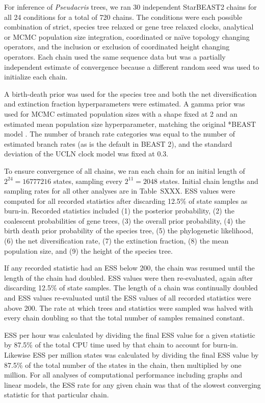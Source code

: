 \documentclass[nogrid]{MBE}%
\begin{document}
For inference of \textit{Pseudacris} trees, we ran 30 independent StarBEAST2
chains for all 24 conditions for a total of 720 chains. The conditions were
each possible combination of strict, species tree relaxed or gene tree relaxed
clocks, analytical or MCMC population size integration, coordinated or na\"ive
topology changing operators, and the inclusion or exclusion of coordinated
height changing operators. Each chain used the same sequence data but was a
partially independent estimate of convergence because a different random seed
was used to initialize each chain.

A birth-death prior was used for the species tree and both the net
diversification and extinction fraction hyperparameters were estimated. A
gamma prior was used for MCMC estimated population sizes with a shape fixed at
2 and an estimated mean population size hyperparameter, matching the original
*BEAST model \citep{Heled01032010}. The number of branch rate categories was
equal to the number of estimated branch rates (as is the default in BEAST 2),
and the standard deviation of the UCLN clock model was fixed at 0.3.

To ensure convergence of all chains, we ran each chain for an initial length
of $2^{24} = 16777216$ states, sampling every $2^{11} = 2048$ states. Initial
chain lengths and sampling rates for all other analyses are in Table~SXXX. ESS
values were computed for all recorded statistics after discarding 12.5\% of
state samples as burn-in. Recorded statistics included (1) the posterior
probability, (2) the coalescent probabilities of gene trees, (3) the overall
prior probability, (4) the birth death prior probability of the species tree,
(5) the phylogenetic likelihood, (6) the net diversification rate, (7) the
extinction fraction, (8) the mean population size, and (9) the height of the
species tree.

If any recorded statistic had an ESS below 200, the chain was resumed until
the length of the chain had doubled. ESS values were then re-evaluated, again
after discarding 12.5\% of state samples. The length of a chain was
continually doubled and ESS values re-evaluated until the ESS values of all
recorded statistics were above 200. The rate at which trees and statistics
were sampled was halved with every chain doubling so that the total number of
samples remained constant.

ESS per hour was calculated by dividing the final ESS value for a given
statistic by 87.5\% of the total CPU time used by that chain to account for
burn-in. Likewise ESS per million states was calculated by dividing the final
ESS value by 87.5\% of the total number of the states in the chain, then
multiplied by one million. For all analyses of computational performance
including graphs and linear models, the ESS rate for any given chain was that
of the slowest converging statistic for that particular chain.
\end{document}
